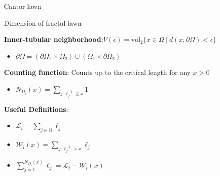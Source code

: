 \documentclass{if-beamer}
\newcommand{\N}{\mathbb{N}}
\newcommand{\SL}{\mathcal{L}}
\newcommand{\W}{\mathcal{W}}
\begin{document}
\begin{frame}{Cantor lawn}
	\begin{center}
	\end{center}
\end{frame}

\begin{frame}{Dimension of fractal lawn}

{\bf Inner-tubular neighborhood}:\quad $V(\epsilon) = \text{vol}_2\{x \in \Omega\ |\ d(x,\partial\Omega) < \epsilon\}$

\begin{itemize}
	\item $\partial\Omega=(\partial\Omega_1\times\Omega_2)\cup(\Omega_1\times\partial\Omega_2)$
\end{itemize}
\vspace{.2in}

{\bf Counting function}: Counts up to the critical length for any $x > 0$
\begin{itemize}
	\item $\displaystyle N_{\Omega_i}(x) = \sum_{j: \ell_j^{-1} \leq x}1$
\end{itemize}
\vspace{.2in}

{\bf Useful Definitions}:
\begin{itemize}
	\item $\displaystyle \SL_i=\sum_{j \in \N }\ell_j$
	\item $\displaystyle \W_i(x)=\sum_{j: \ell_j^{-1} > x}\ell_j$
	\pause
	\item $\displaystyle \sum_{j = 1}^{N_{\Omega_i}(x)}\ell_j=\SL_i - \W_i(x)$
\end{itemize}


\end{frame}
\end{document}
